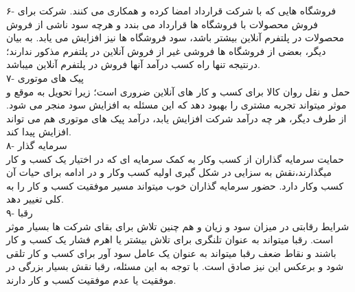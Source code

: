 \documentclass[12pt]{report}
\begin{document}
۶- فروشگاه هایی که با شرکت قرارداد امضا کرده و همکاری می کنند. 
شرکت برای فروش محصولات با فروشگاه ها قرارداد می بندد و هرچه سود ناشی از فروش محصولات در پلتفرم آنلاین بیشتر باشد، سود فروشگاه ها نیز افزایش می یابد. به بیان دیگر، بعضی از فروشگاه ها فروشی غیر از فروش آنلاین در پلتفرم مذکور ندارند؛ درنتیجه تنها راه کسب درآمد آنها فروش در پلتفرم آنلاین میباشد.\\
۷- پیک های موتوری \\
حمل و نقل روان کالا برای کسب و کار های آنلاین ضروری است؛ زیرا تحویل به موقع و موثر میتواند تجربه مشتری را بهبود دهد که این مسئله به افزایش سود منجر می شود. از طرف دیگر، هر چه درآمد شرکت افزایش یابد، درآمد پیک های موتوری هم می تواند افزایش پیدا کند.\\
۸- سرمایه گذار\\
حمایت سرمایه گذاران از کسب وکار به کمک سرمایه ای که در اختیار یک کسب و کار میگذارند،‌نقش به سزایی در شکل گیری اولیه کسب وکار و در ادامه برای حیات آن کسب وکار دارد. حضور سرمایه گذاران خوب میتواند مسیر موفقیت کسب و کار را به کلی تغییر دهد.\\
۹- رقبا\\
شرایط رقابتی در میزان سود و زیان و هم چنین تلاش برای بقای شرکت ها بسیار موثر است. رقبا میتواند به عنوان تلنگری برای تلاش بیشتر یا اهرم فشار یک کسب و کار باشند و نقاط ضعف رقبا میتواند به عنوان یک عامل سود آور برای کسب و کار تلقی شود و برعکس این نیز صادق است. با توجه به این مسئله، رقبا نقش بسیار بزرگی در موفقیت یا عدم موفقیت کسب و کار دارند.
\end{document}
